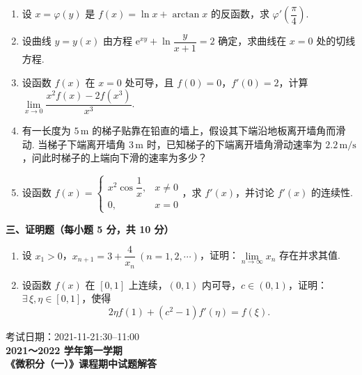 \documentclass[a4paper,11pt]{ctexart}
\newcommand{\e}{\mathrm{e}}
\begin{document}
\begin{enumerate}[label=\arabic*., start=11, leftmargin=2em, itemsep=0.95em, topsep=0.5em]
  \item 设 $x = \varphi(y)$ 是 $f(x) = \ln x + \arctan x$ 的反函数，求 $\varphi'\left(\dfrac{\pi}{4}\right)$.

  \item 设曲线 $y = y(x)$ 由方程 $\e^{xy} + \ln\dfrac{y}{x+1} = 2$ 确定，求曲线在 $x = 0$ 处的切线方程.

  \item 设函数 $f(x)$ 在 $x = 0$ 处可导，且 $f(0) = 0$，$f'(0) = 2$，计算 $\lim\limits_{x\to 0}\dfrac{x^2 f(x) - 2 f(x^3)}{x^3}$.

  \item 有一长度为 $5\,\mathrm{m}$ 的梯子贴靠在铅直的墙上，假设其下端沿地板离开墙角而滑动. 当梯子下端离开墙角 $3\,\mathrm{m}$ 时，已知梯子的下端离开墙角滑动速率为 $2.2\,\mathrm{m/s}$，问此时梯子的上端向下滑的速率为多少？

  \item 设函数 $f(x) = \begin{cases} x^2 \cos\dfrac{1}{x}, & x\neq 0 \\[0.4em] 0, & x = 0 \end{cases}$，求 $f'(x)$，并讨论 $f'(x)$ 的连续性.
\end{enumerate}

\vspace{0.9em}

\textbf{三、证明题（每小题 5 分，共 10 分）}

\begin{enumerate}[label=\arabic*., start=16, leftmargin=2em, itemsep=0.95em, topsep=0.5em]
  \item 设 $x_1 > 0$，$x_{n+1} = 3 + \dfrac{4}{x_n}~(n = 1, 2, \cdots)$，证明：$\lim\limits_{n\to\infty} x_n$ 存在并求其值.

  \item 设函数 $f(x)$ 在 $[0, 1]$ 上连续，$(0, 1)$ 内可导，$c \in (0, 1)$，证明：$\exists\,\xi, \eta \in [0, 1]$，使得
  \[
    2\eta f(1) + (c^2 - 1)f'(\eta) = f(\xi).
  \]
\end{enumerate}

\newpage

\begin{center}
  {\small 考试日期：2021-11-21:30--11:00}\\[0.6em]
  {\Large\bfseries 2021～2022 学年第一学期}\\[0.4em]
  {\Large\bfseries 《微积分（一）》课程期中试题解答}
\end{center}
\end{document}
